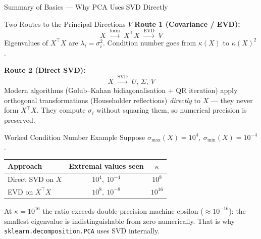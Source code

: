 \documentclass{beamer}
\begin{document}
\begin{frame}[shrink=30]{Summary of Basics --- Why PCA Uses SVD Directly}
  \begin{block}{Two Routes to the Principal Directions $V$}
    \textbf{Route 1 (Covariance / EVD):}
    \[
      X \;\xrightarrow{\text{form}}\; X^\top X
        \;\xrightarrow{\text{EVD}}\; V
    \]
    Eigenvalues of $X^\top X$ are $\lambda_i = \sigma_i^2$.
    Condition number goes from $\kappa(X)$ to $\kappa(X)^2$.

    \medskip

    \textbf{Route 2 (Direct SVD):}
    \[
      X \;\xrightarrow{\text{SVD}}\; U,\,\Sigma,\,V
    \]
    Modern algorithms (Golub--Kahan bidiagonalisation + QR iteration)
    apply orthogonal transformations (Householder reflections)
    \emph{directly} to $X$ --- they never form $X^\top X$.
    They compute $\sigma_i$ without squaring them, so numerical
    precision is preserved.
  \end{block}

  \begin{block}{Worked Condition Number Example}
    Suppose $\sigma_{\max}(X)=10^4,\ \sigma_{\min}(X)=10^{-4}$.

    \centering
    \renewcommand{\arraystretch}{1.4}
    \begin{tabular}{lcc}
      \toprule
      \textbf{Approach} & \textbf{Extremal values seen} & \textbf{$\kappa$}\\
      \midrule
      Direct SVD on $X$ & $10^4,\ 10^{-4}$ & $10^8$\\
      EVD on $X^\top X$ & $10^8,\ 10^{-8}$ & $10^{16}$\\
      \bottomrule
    \end{tabular}

    \medskip
    At $\kappa = 10^{16}$ the ratio exceeds double-precision
    machine epsilon ($\approx 10^{-16}$): the smallest eigenvalue
    is indistinguishable from zero numerically.
    That is why \texttt{sklearn.decomposition.PCA} uses SVD internally.
  \end{block}
\end{frame}
\end{document}

